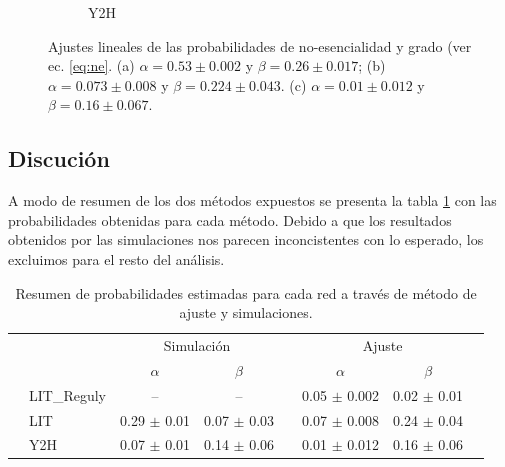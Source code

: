 \begin{figure}[!ht]
\begin{subfigure}[b]{0.4\columnwidth}
        \caption{\label{fig:y2h} Y2H}
    \end{subfigure}
    \caption{\label{fig:fit} Ajustes lineales de las probabilidades de no-esencialidad y grado (ver ec. \ref{eq:ne}. 
(a) $\alpha = 0.53 \pm 0.002 $ y $\beta = 0.26 \pm 0.017$; (b) $\alpha = 0.073 \pm 0.008$ y $\beta = 0.224 \pm 0.043$.
(c) $\alpha = 0.01 \pm 0.012 $ y $\beta = 0.16 \pm 0.067$.}
\end{figure}





\subsection{Discuci\'on}

A modo de resumen de los dos m\'etodos expuestos se presenta la tabla \ref{tab:probas} con las probabilidades obtenidas para 
cada m\'etodo. Debido a que los resultados obtenidos por las simulaciones nos parecen inconcistentes con lo esperado, los 
excluimos para el resto del an\'alisis.
\begin{table}[!ht]
    \centering
    \caption{\label{tab:probas} Resumen de probabilidades estimadas para cada red a trav\'es de m\'etodo de ajuste
y simulaciones.}
    {\scriptsize
    \begin{tabularx}{.9\columnwidth}{XlccXccX}
        \hline\hline
        &               &  \multicolumn{2}{c}{Simulaci\'on}  &&  \multicolumn{2}{c}{Ajuste}          &      \\
        \cline{3-4} \cline{6-7}
        &               &   $\alpha$    & $\beta$        &&   $\alpha$       &       $\beta$     & \\
        \hline
        & LIT\_Reguly   & --         & --                    && 0.05 $\pm$ 0.002  & 0.02 $\pm$ 0.01       &               \\
        & LIT           & 0.29 $\pm$ 0.01 & 0.07 $\pm$ 0.03  && 0.07 $\pm$ 0.008  & 0.24 $\pm$ 0.04       &               \\
        & Y2H           & 0.07 $\pm$ 0.01 & 0.14 $\pm$ 0.06  && 0.01 $\pm$ 0.012  & 0.16 $\pm$ 0.06    &               \\
        \hline\hline
    \end{tabularx}
    }
\end{table}

